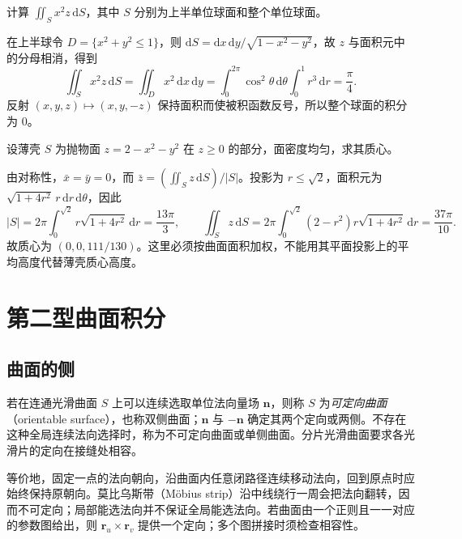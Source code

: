 \begin{example}
\label{ex:first-surface-integral-sphere-oddness}
计算 $\iint_Sx^2z\,\mathrm dS$，其中 $S$ 分别为上半单位球面和整个单位球面。
\end{example}
\begin{solve}
在上半球令 $D=\{x^2+y^2\leq1\}$，则 $\mathrm dS=\mathrm dx\,\mathrm dy/\sqrt{1-x^2-y^2}$，故 $z$ 与面积元中的分母相消，得到
\[
    \iint_Sx^2z\,\mathrm dS
    =\iint_Dx^2\,\mathrm dx\,\mathrm dy
    =\int_0^{2\pi}\cos^2\theta\,\mathrm d\theta\int_0^1r^3\,\mathrm dr
    =\frac\pi4.
\]
反射 $(x,y,z)\mapsto(x,y,-z)$ 保持面积而使被积函数反号，所以整个球面的积分为 $0$。
\end{solve}

\begin{example}
\label{ex:first-surface-integral-paraboloid-centroid}
设薄壳 $S$ 为抛物面 $z=2-x^2-y^2$ 在 $z\geq0$ 的部分，面密度均匀，求其质心。
\end{example}
\begin{solve}
由对称性，$\bar x=\bar y=0$，而 $\bar z=(\iint_Sz\,\mathrm dS)/|S|$。投影为 $r\leq\sqrt2$，面积元为 $\sqrt{1+4r^2}\,r\,\mathrm dr\,\mathrm d\theta$，因此
\[
    |S|=2\pi\int_0^{\sqrt2}r\sqrt{1+4r^2}\,\mathrm dr=\frac{13\pi}3,
    \qquad
    \iint_Sz\,\mathrm dS
    =2\pi\int_0^{\sqrt2}(2-r^2)r\sqrt{1+4r^2}\,\mathrm dr
    =\frac{37\pi}{10}.
\]
故质心为 $(0,0,111/130)$。这里必须按曲面面积加权，不能用其平面投影上的平均高度代替薄壳质心高度。
\end{solve}

\section{第二型曲面积分}
\label{sec:surface-integrals-of-the-second-kind}

\subsection{曲面的侧}
\label{subsec:sides-of-surfaces}

\begin{definition}
\label{def:orientable-surface}
若在连通光滑曲面 $S$ 上可以连续选取单位法向量场 $\boldsymbol n$，则称 $S$ 为\emph{可定向曲面}（orientable surface），也称双侧曲面；$\boldsymbol n$ 与 $-\boldsymbol n$ 确定其两个定向或两侧。不存在这种全局连续法向选择时，称为不可定向曲面或单侧曲面。分片光滑曲面要求各光滑片的定向在接缝处相容。
\end{definition}

等价地，固定一点的法向朝向，沿曲面内任意闭路径连续移动法向，回到原点时应始终保持原朝向。莫比乌斯带（M\"obius strip）沿中线绕行一周会把法向翻转，因而不可定向；局部能选法向并不保证全局能选法向。若曲面由一个正则且一一对应的参数图给出，则 $\boldsymbol r_u\times\boldsymbol r_v$ 提供一个定向；多个图拼接时须检查相容性。

